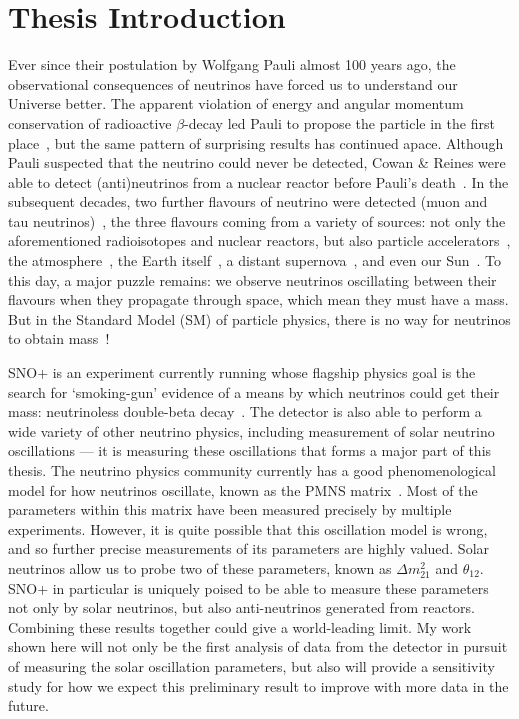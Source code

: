 \section{Thesis Introduction}\label{sect:Introduction}

Ever since their postulation by Wolfgang Pauli almost 100 years ago, the observational consequences of neutrinos have forced us to understand our Universe better. The apparent violation of energy and angular momentum conservation of radioactive $\beta$-decay led Pauli to propose the particle in the first place~\cite{noauthor_rapports_1935}, but the same pattern of surprising results has continued apace. Although Pauli suspected that the neutrino could never be detected, Cowan \& Reines were able to detect (anti)neutrinos from a nuclear reactor before Pauli's death~\cite{reines_neutrino_1956,cowan_detection_1956}. In the subsequent decades, two further flavours of neutrino were detected (muon and tau neutrinos)~\cite{danby_observation_1962,kodama_observation_2001}, the three flavours coming from a variety of sources: not only the aforementioned radioisotopes and nuclear reactors, but also particle accelerators~\cite{danby_observation_1962}, the atmosphere~\cite{abe_atmospheric_2018}, the Earth itself~\cite{agostini_comprehensive_2020}, a distant supernova~\cite{hirata_observation_1987}, and even our Sun~\cite{cleveland_measurement_1998}. To this day, a major puzzle remains: we observe neutrinos oscillating between their flavours when they propagate through space, which mean they must have a mass. But in the Standard Model (SM) of particle physics, there is no way for neutrinos to obtain mass~\cite{particle_data_group_review_2020}!

SNO+ is an experiment currently running whose flagship physics goal is the search for `smoking-gun' evidence of a means by which neutrinos could get their mass: neutrinoless double-beta decay~\cite{albanese_sno_2021}. The detector is also able to perform a wide variety of other neutrino physics, including measurement of solar neutrino oscillations --- it is measuring these oscillations that forms a major part of this thesis. The neutrino physics community currently has a good phenomenological model for how neutrinos oscillate, known as the PMNS matrix~\cite{particle_data_group_review_2020}. Most of the parameters within this matrix have been measured precisely by multiple experiments. However, it is quite possible that this oscillation model is wrong, and so further precise measurements of its parameters are highly valued. Solar neutrinos allow us to probe two of these parameters, known as $\Delta m^{2}_{21}$ and $\theta_{12}$. SNO+ in particular is uniquely poised to be able to measure these parameters not only by solar neutrinos, but also anti-neutrinos generated from reactors. Combining these results together could give a world-leading limit. My work shown here will not only be the first analysis of data from the detector in pursuit of measuring the solar oscillation parameters, but also will provide a sensitivity study for how we expect this preliminary result to improve with more data in the future.

